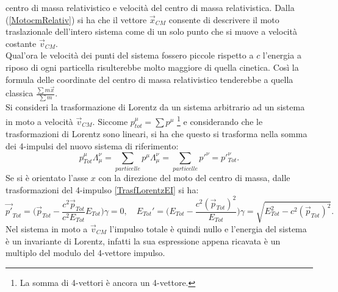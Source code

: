 centro di massa relativistico e velocità del centro di massa relativistica. Dalla (\ref{MotocmRelativ}) si ha che il vettore $\vec x_{CM}$ consente di descrivere il moto traslazionale dell'intero sistema come di un solo punto che si muove a velocità  costante $\vec v_{CM}$.\\
 Qual'ora le velocità dei punti del sistema fossero piccole rispetto a $c$ l'energia a riposo di ogni particella risulterebbe molto maggiore di quella cinetica. Così la formula delle coordinate del centro di massa relativistico tenderebbe a quella classica $\frac{\sum m\vec{x}}{\sum m}$.\\

Si consideri la trasformazione di Lorentz da un sistema arbitrario ad un sistema in moto a velocità $\vec v_{CM}$. Siccome $p_{tot}^\mu=\sum p^\mu$ \footnote{La somma di 4-vettori è ancora un 4-vettore.} e considerando che le trasformazioni di Lorentz sono lineari, si ha che questo si trasforma nella somma dei 4-impulsi del nuovo sistema di riferimento:
\begin{equation*}
    p^\mu_{Tot}\Lambda_\mu^\nu=\sum_{particelle} p^\mu\Lambda_\mu^\nu=\sum_{particelle} p'^\nu=p'^\nu_{Tot}.
\end{equation*}
Se si è orientato l'asse $x$ con la direzione del moto del centro di massa, dalle trasformazioni del 4-impulso \eqref{TrasfLorentzEI} si ha:
\begin{equation*}
    \vec{p'}_{Tot}=\bigg( \vec{p}_{Tot}-\frac{c^2 \vec{p}_{Tot}}{c^2 E_{Tot}}E_{Tot}\bigg)\gamma=0, \quad E_{Tot}'=\bigg(E_{Tot}-\frac{c^2(\vec{p}_{Tot})^2}{E_{Tot}}\bigg)\gamma=\sqrt{E^2_{Tot}-c^2(\vec{p}_{Tot})^2}. 
\end{equation*}
Nel sistema in moto a $\vec v_{CM}$ l'impulso totale è quindi nullo e l'energia del sistema è un invariante di Lorentz, infatti la sua espressione appena ricavata è un multiplo del modulo del 4-vettore impulso.